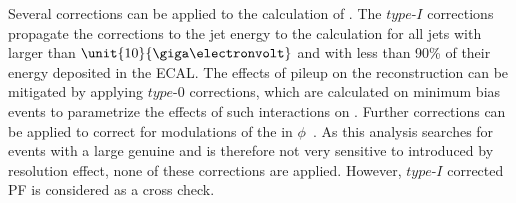 Several corrections can be applied to the calculation of \MET. The $\textit{type-I}$ corrections propagate the corrections to the jet energy to the \MET calculation for all jets with \pt larger than $\unit{10}{\giga\electronvolt}$ and with less than 90\% of their energy deposited in the ECAL. The effects of pileup on the \MET reconstruction can be mitigated by applying $\textit{type-0}$ corrections, which are calculated on minimum bias events to parametrize the effects of such interactions on \MET. Further corrections can be applied to correct for modulations of the \MET in $\phi$~\cite{CMS-PAS-JME-12-002}. As this analysis searches for events with a large genuine \MET and is therefore not very sensitive to \MET introduced by resolution effect, none of these corrections are applied. However, $\textit{type-I}$ corrected PF \MET is considered as a cross check. 
